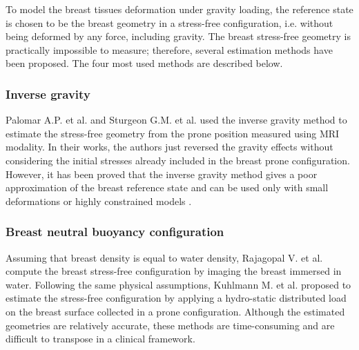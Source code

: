 To model the breast tissues deformation under gravity loading, the reference state is chosen to be the breast geometry in a stress-free configuration, i.e. without being deformed by any force, including gravity. The breast stress-free geometry is practically impossible to measure; therefore, several estimation methods have been proposed. The four most used methods are described below.

 
 
  \subsubsection*{Inverse gravity}\label{subsubsection:inversegravity}
Palomar A.P. et al. \citep{palomar_finite_2008} and Sturgeon G.M. et al. \citep{ sturgeon_finite_element_2016} used the inverse gravity method to estimate the stress-free geometry from the prone position measured using MRI modality. In their works, the authors just reversed the gravity effects without considering the initial stresses already included in the breast prone configuration. However, it has been proved that the inverse gravity method gives a poor approximation of the breast reference state and can be used only with small deformations or highly constrained models \citep{eiben_breast_2014}.  

 \subsubsection*{Breast neutral buoyancy configuration}
 Assuming that breast density is equal to water density, Rajagopal V. et al. \citep{rajagopal_creating_2008} compute the breast stress-free configuration by imaging the breast immersed in water. Following the same physical assumptions, Kuhlmann M. et al. \citep{kuhlmann_mechanical_2013} proposed to estimate the stress-free configuration by applying a hydro-static distributed load on the breast surface collected in a prone configuration. Although the estimated geometries are relatively accurate, these methods are time-consuming and are difficult to transpose in a clinical framework. 

